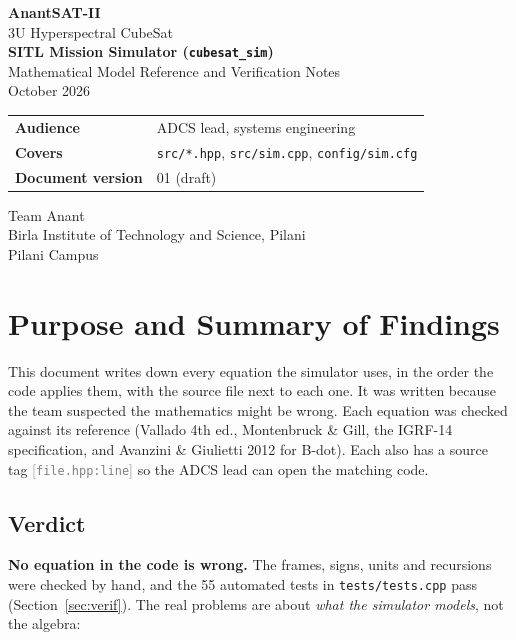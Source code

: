 \documentclass[11pt,a4paper]{article}
\newcommand{\code}[1]{\texttt{#1}}
\newcommand{\src}[1]{\textcolor{gray}{\small[\texttt{#1}]}}
\begin{document}
\begin{titlepage}
\centering
\vspace*{3cm}
{\Huge \textbf{AnantSAT-II}}\\[0.4cm]
{\Large 3U Hyperspectral CubeSat}\\[1.5cm]
{\LARGE \textbf{SITL Mission Simulator (\texttt{cubesat\_sim})}}\\[0.3cm]
{\Large Mathematical Model Reference and Verification Notes}\\[0.5cm]
{\Large October 2026}\\[2.5cm]
\begin{tabular}{ll}
\textbf{Audience} & ADCS lead, systems engineering \\[0.3cm]
\textbf{Covers} & \texttt{src/*.hpp}, \texttt{src/sim.cpp}, \texttt{config/sim.cfg} \\[0.3cm]
\textbf{Document version} & 01 (draft) \\
\end{tabular}
\vfill
{\large Team Anant\\ Birla Institute of Technology and Science, Pilani\\ Pilani Campus}
\end{titlepage}

\tableofcontents
\newpage

\section{Purpose and Summary of Findings}

This document writes down every equation the simulator uses, in the order the code applies them, with the source file next to each one. It was written because the team suspected the mathematics might be wrong. Each equation was checked against its reference (Vallado 4th ed., Montenbruck \& Gill, the IGRF-14 specification, and Avanzini \& Giulietti 2012 for B-dot). Each also has a source tag \src{file.hpp:line} so the ADCS lead can open the matching code.

\subsection*{Verdict}

\textbf{No equation in the code is wrong.} The frames, signs, units and recursions were checked by hand, and the 55 automated tests in \code{tests/tests.cpp} pass (Section~\ref{sec:verif}). The real problems are about \emph{what the simulator models}, not the algebra:
\end{document}
